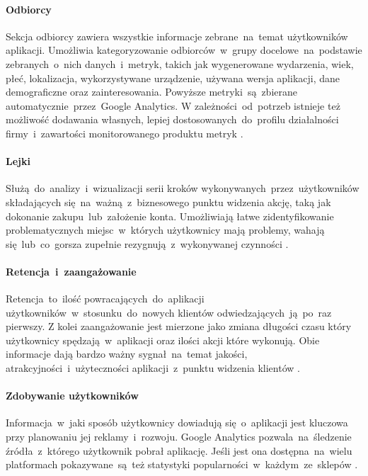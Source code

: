 \paragraph{Odbiorcy}
\label{par:ga-audiences}
Sekcja odbiorcy zawiera wszystkie informacje zebrane~na~temat użytkowników aplikacji. Umożliwia kategoryzowanie odbiorców~w~grupy docelowe~na~podstawie zebranych~o~nich danych~i~metryk, takich jak wygenerowane wydarzenia, wiek, płeć, lokalizacja, wykorzystywane urządzenie, używana wersja aplikacji, dane demograficzne oraz zainteresowania. Powyższe metryki~są~zbierane automatycznie~przez~Google Analytics. W zależności~od~potrzeb istnieje też możliwość dodawania własnych, lepiej dostosowanych~do~profilu działalności firmy~i~zawartości monitorowanego produktu metryk \cite{GA_Audiences}.

\paragraph{Lejki}
\label{par:ga-funnels}
Służą~do~analizy~i~wizualizacji serii kroków wykonywanych~przez~użytkowników składających się~na~ważną~z~biznesowego punktu widzenia akcję, taką jak dokonanie zakupu~lub~założenie konta. Umożliwiają łatwe zidentyfikowanie problematycznych miejsc~w~których użytkownicy mają problemy, wahają się~lub~co~gorsza  zupełnie rezygnują~z~wykonywanej czynności \cite{GA_Funnels}.

\paragraph{Retencja~i~zaangażowanie} 
\label{par:ga-retention}
Retencja~to~ilość powracających~do~aplikacji  użytkowników~w~stosunku~do~nowych klientów odwiedzających~ją~po~raz pierwszy. Z kolei zaangażowanie jest mierzone jako zmiana długości czasu który użytkownicy spędzają~w~aplikacji oraz ilości akcji które wykonują. Obie informacje dają bardzo ważny sygnał~na~temat jakości, atrakcyjności~i~użyteczności aplikacji~z~punktu widzenia klientów \cite{GA_Retention}.

\paragraph{Zdobywanie użytkowników}
Informacja~w~jaki sposób użytkownicy dowiadują się~o~aplikacji jest kluczowa przy planowaniu jej reklamy~i~rozwoju. Google Analytics pozwala~na~śledzenie źródła~z~którego użytkownik pobrał aplikację. Jeśli jest ona dostępna~na~wielu platformach pokazywane~są~też statystyki popularności~w~każdym~ze~sklepów \cite{GA_Aquisition}.
